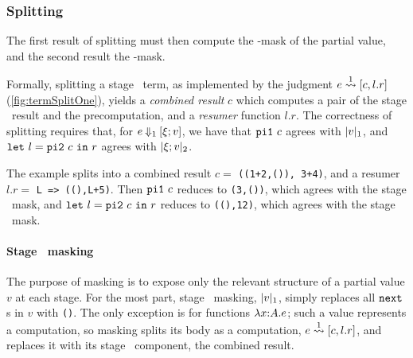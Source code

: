 
\subsubsection{Splitting}

The first result
of splitting must then compute the \bbone-mask of the partial value, and the
second result the \bbtwo-mask. 


Formally, splitting a stage \bbone\ term, as implemented by the judgment $e
\overset{ 1}\rightsquigarrow [c,l.r]$ (\ref{fig:termSplitOne}), yields a \emph{combined result}
$c$ which computes a pair of the stage \bbone\ result and the precomputation,
and a \emph{resumer} function $l.r$. The correctness of splitting requires that,
for $e\mathbin{{\Downarrow_{ 1}}}[\xi;v]$, we have that ${\tt pi1}~c$ agrees with
$|v|_{ 1}$, and ${\tt let}~{l} = {{\tt pi2}~c}~{\tt in}~{r}$ agrees with $|\xi;v|_{ 2}$.

The example splits into a combined result $c=$ \texttt{((1+2,()), 3+4)}, and a
resumer $l.r=$ \texttt{L => ((),L+5)}. Then ${\tt pi1}~c$ reduces to \texttt{(3,())},
which agrees with the stage \bbone\ mask, and ${\tt let}~{l} = {{\tt pi2}~c}~{\tt in}~{r}$ reduces to
\texttt{((),12)}, which agrees with the stage \bbtwo\ mask.

\paragraph{Stage \bbone\ masking}

The purpose of masking is to expose only the relevant structure of a partial
value $v$ at each stage. For the most part, stage \bbone\ masking, $|v|_{ 1}$,
simply replaces all ${\tt next}$s in $v$ with \texttt{()}. The only exception is for
functions $\lambda{x}\mathrm{:}{A}.{e}$; such a value represents a computation, so masking splits
its body as a computation, $e\overset{ 1}\rightsquigarrow [c,l.r]$, and replaces it with its
stage \bbone\ component, the combined result.

